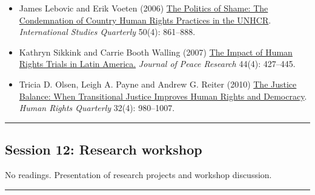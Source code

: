 \documentclass[12pt, a4paper]{article}
\begin{document}
\begin{itemize}
	\item James Lebovic and Erik Voeten (2006) \href{https://doi.org/10.1111/j.1468-2478.2006.00429.x}{The Politics of Shame: The Condemnation of Country Human Rights Practices in the UNHCR}. \textit{International Studies Quarterly} 50(4): 861--888.
  \item Kathryn Sikkink and Carrie Booth Walling (2007) \href{https://doi.org/10.1177/0022343307078953}{The Impact of Human Rights Trials in Latin America.} \textit{Journal of Peace Research} 44(4): 427--445.
	\item Tricia D. Olsen, Leigh A. Payne and Andrew G. Reiter (2010) \href{https://doi.org/10.1353/hrq.2010.0021}{The Justice Balance: When Transitional Justice Improves Human Rights and Democracy}. \textit{Human Rights Quarterly} 32(4): 980--1007.
\end{itemize}

\vspace{20pt}
\hrule
\subsection*{Session 12: Research workshop}

No readings. Presentation of research projects and workshop discussion.

\vspace{20pt}
\hrule



\end{document}
